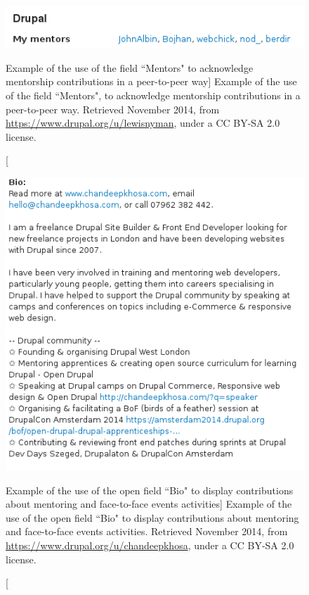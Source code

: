     \begin{figure}[H]
        \centering
\includegraphics[scale=0.5]{img/profiles/profiles_mentors.png}
        \caption[Example of the use of the field ``Mentors" to acknowledge mentorship contributions in a peer-to-peer way]%
        {Example of the use of the field ``Mentors", to acknowledge mentorship contributions in a peer-to-peer way. Retrieved  November 2014, from \url{https://www.drupal.org/u/lewisnyman}, under a CC BY-SA 2.0 license.}
        \label{profiles_mentors}
    \end{figure}

    \begin{figure}[H]
        \centering
        \includegraphics[scale=0.5]{img/profiles/profiles_bio.png}
        \caption[Example of the use of the open field ``Bio" to display contributions about mentoring and face-to-face events activities]%
        {Example of the use of the open field ``Bio" to display contributions about mentoring and face-to-face events activities. Retrieved  November 2014, from \url{https://www.drupal.org/u/chandeepkhosa}, under a CC BY-SA 2.0 license.}
        \label{profiles_bio}
    \end{figure}

